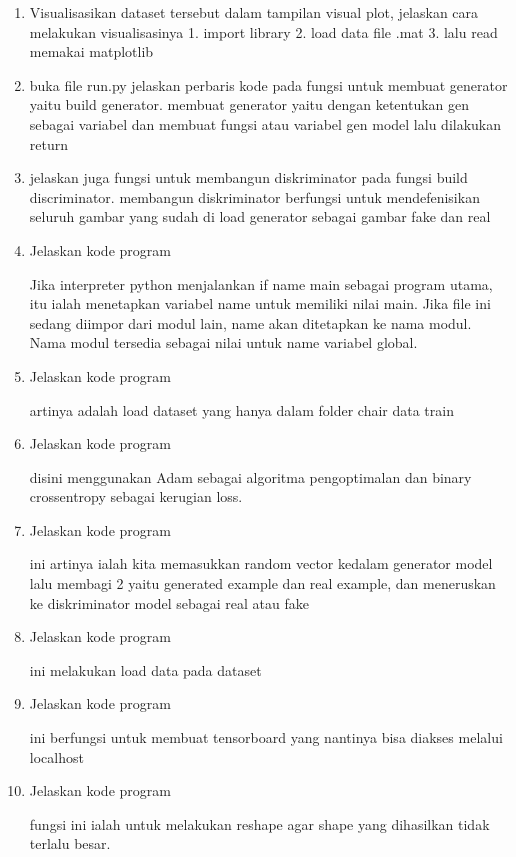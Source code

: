 \begin{enumerate}
\item Visualisasikan dataset tersebut dalam tampilan visual plot, jelaskan cara melakukan visualisasinya
1. import library									   2. load data file .mat  								  3. lalu read memakai matplotlib

\item buka file run.py jelaskan perbaris kode pada fungsi untuk membuat generator yaitu build generator.
membuat generator yaitu dengan ketentukan gen sebagai variabel dan membuat fungsi atau variabel gen model lalu dilakukan return

\item jelaskan juga fungsi untuk membangun diskriminator pada fungsi build discriminator.
membangun diskriminator berfungsi untuk mendefenisikan seluruh gambar yang sudah di load generator sebagai gambar fake dan real

\item Jelaskan kode program

Jika interpreter python menjalankan if name main  sebagai program utama, itu ialah menetapkan variabel name  untuk memiliki nilai main. Jika file ini sedang diimpor dari modul lain, name akan ditetapkan ke nama modul. Nama modul tersedia sebagai nilai untuk name variabel global.

\item Jelaskan kode program 

artinya adalah load dataset yang hanya dalam folder chair data train

\item Jelaskan kode program 

disini menggunakan Adam sebagai algoritma pengoptimalan dan binary crossentropy sebagai kerugian loss. 

\item Jelaskan kode program 

ini artinya ialah kita memasukkan random vector kedalam generator model lalu membagi 2 yaitu generated example dan real example, dan meneruskan ke diskriminator model sebagai real atau fake

\item Jelaskan kode program 

ini melakukan load data pada dataset

\item Jelaskan kode program 

ini berfungsi untuk membuat tensorboard yang nantinya bisa diakses melalui localhost

\item Jelaskan kode program 

fungsi ini ialah untuk melakukan reshape agar shape yang dihasilkan tidak terlalu besar.


\end{enumerate}
